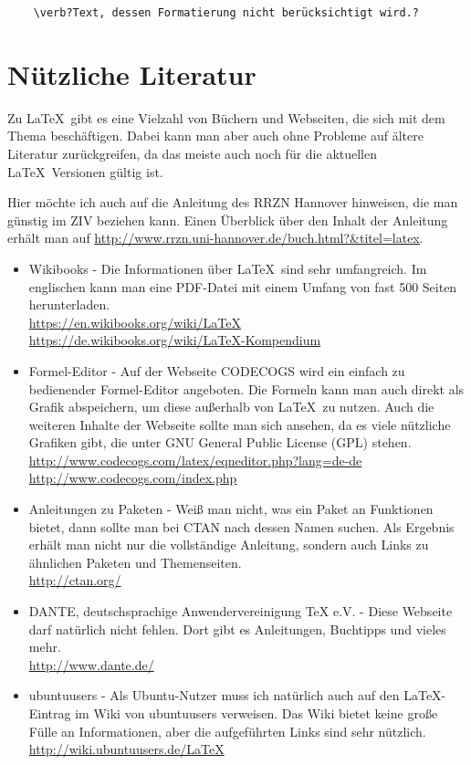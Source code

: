 \begin{verbatim}
    \verb?Text, dessen Formatierung nicht berücksichtigt wird.?
\end{verbatim}

\newpage
\chapter{Nützliche Literatur}

Zu \LaTeX\ gibt es eine Vielzahl von Büchern und Webseiten, die sich mit dem Thema beschäftigen. Dabei kann man aber auch ohne Probleme auf ältere Literatur zurückgreifen, da das meiste auch noch für die aktuellen \LaTeX\ Versionen gültig ist.

Hier möchte ich auch auf die Anleitung des RRZN Hannover hinweisen, die man günstig im ZIV beziehen kann. Einen Überblick über den Inhalt der Anleitung erhält man auf \url{http://www.rrzn.uni-hannover.de/buch.html?&titel=latex}.

\begin{itemize}
    \item Wikibooks - Die Informationen über \LaTeX\ sind sehr umfangreich. Im englischen kann man eine PDF-Datei mit einem Umfang von fast 500 Seiten herunterladen.\\
    \url{https://en.wikibooks.org/wiki/LaTeX}\\
    \url{https://de.wikibooks.org/wiki/LaTeX-Kompendium}
    \item Formel-Editor - Auf der Webseite CODECOGS wird ein einfach zu bedienender Formel-Editor angeboten. Die Formeln kann man auch direkt als Grafik abspeichern, um diese außerhalb von \LaTeX\ zu nutzen. Auch die weiteren Inhalte der Webseite sollte man sich ansehen, da es viele nützliche Grafiken gibt,
    die unter GNU General Public License (GPL) stehen.\\
    \url{http://www.codecogs.com/latex/eqneditor.php?lang=de-de}\\
    \url{http://www.codecogs.com/index.php}
    \item Anleitungen zu Paketen - Weiß man nicht, was ein Paket an Funktionen bietet, dann sollte man bei CTAN nach dessen Namen suchen. Als Ergebnis erhält man nicht nur die vollständige Anleitung, sondern auch Links zu ähnlichen Paketen und Themenseiten.\\
    \url{http://ctan.org/}
    \item DANTE, deutschsprachige Anwendervereinigung TeX e.V. - Diese Webseite darf natürlich nicht fehlen. Dort gibt es Anleitungen, Buchtipps und vieles mehr.\\
    \url{http://www.dante.de/}
    \item ubuntuusers - Als Ubuntu-Nutzer muss ich natürlich auch auf den \LaTeX-Eintrag im Wiki von ubuntuusers verweisen. Das Wiki bietet keine große Fülle an Informationen, aber die aufgeführten Links sind sehr nützlich.\\
    \url{http://wiki.ubuntuusers.de/LaTeX}
\end{itemize}

